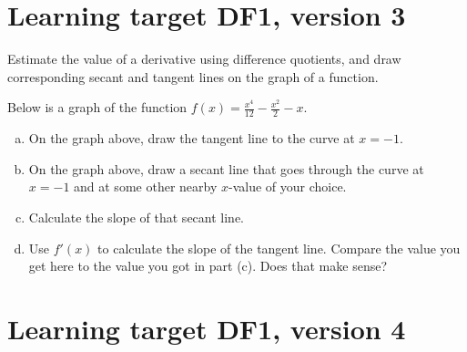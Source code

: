 \section{Learning target DF1, version 3}


Estimate the value of a derivative using difference quotients, and draw corresponding secant and tangent lines on the graph of a function.

\hrulefill


Below is a graph of the function $\displaystyle f(x)=\frac{x^4}{12}-\frac{x^2}{2}-x$. 
\begin{center}
\end{center}

\begin{enumerate}[(a)]
\item On the graph above, draw the tangent line to the curve at $x=-1$. 

\item On the graph above, draw a secant line that goes through the curve at $x=-1$ and at some other nearby $x$-value of your choice.

\item Calculate the slope of that secant line.

\vfill

\item Use $f'(x)$ to calculate the slope of the tangent line. Compare the value you get here to the value you got in part (c). Does that make sense?

\vfill
\end{enumerate}

\pagebreak


\section{Learning target DF1, version 4}

